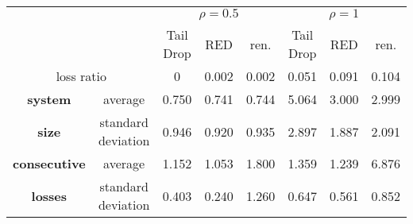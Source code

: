\begin{multicols}{2}


\begin{table*}\small
\begin{center}
\parbox{400pt}{
}
\vspace*{2ex}

\tabcolsep=8pt
\begin{tabular}{cc|c|c|c||c|c|c|}
\cline{3-8}
                                        &  & \multicolumn{3}{c||}{$\rho=0.5$} & \multicolumn{3}{c|}{$\rho=1$} \\ \cline{3-8} 
                                        &  &   Tail Drop      & RED     &    ren.   &    Tail Drop   &      RED &    ren.   \\ \hline
\multicolumn{2}{|c|}{loss ratio}    &   0    &   0.002        &   0.002  &    0.051   &    0.091        &   0.104    \\ \hline
\multicolumn{1}{|c|}{\textbf{system}} & average &   0.750    &   0.741        &    0.744    &    5.064   &      3.000       &   2.999  \\ \cline{2-8} 
\multicolumn{1}{|c|}{\textbf{size}} & standard deviation &   0.946    &    0.920      &    0.935      &    2.897   &   1.887       &   2.091      \\ \hline
\multicolumn{1}{|c|}{\textbf{consecutive}} &average  &  1.152     &  1.053        &   1.800     &    1.359   &    1.239       &  6.876         \\ \cline{2-8} 
\multicolumn{1}{|c|}{\textbf{losses}} & standard deviation &  0.403     &   0.240       &    1.260     &    0.647   &       0.561        &   0.852     \\ \hline
\end{tabular}
\end{center}
\vspace*{-6pt}
\end{table*}




\begin{table*}\small %
\begin{center}
\parbox{400pt}{
}
\vspace*{2ex}


\end{center}
\end{table*}
\end{multicols}
